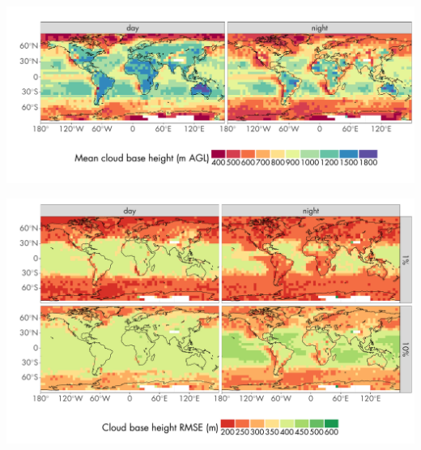 \documentclass[final,t,12pt]{beamer}\usepackage[]{graphicx}\usepackage[]{color}
\newenvironment{knitrout}{}{} %
\begin{document}
\begin{frame}[fragile]{}
\begin{tcolorbox}
\begin{tcbitemize}[raster equal height=rows, raster columns = 11
      ]
\begin{tcbitemize}[raster columns=1]
\begin{knitrout}
{\centering \includegraphics[width=\textwidth]{figure/cfmip-cbase-170926-cbase-base-1} 

}



\end{knitrout}

        \tcbitem[title={CBH uncertainty}]
\begin{knitrout}
\color{fgcolor}

{\centering \includegraphics[width=\textwidth]{figure/cfmip-cbase-170926-cbase-uncert-quantiles-1} 

}



\end{knitrout}


\end{tcbitemize}
\end{tcbitemize}
\end{tcolorbox}
\end{frame}
\end{document}

